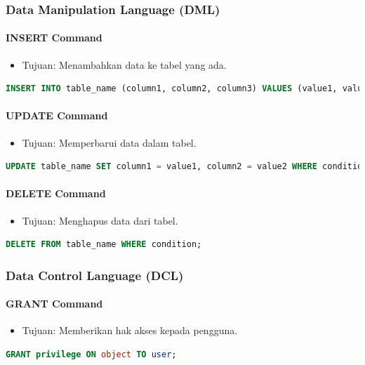 \documentclass{article}
\begin{document}
\subsubsection{Data Manipulation Language (DML)}
\paragraph{INSERT Command}
\begin{itemize}
    \item Tujuan: Menambahkan data ke tabel yang ada.
\end{itemize}
\begin{lstlisting}[language=SQL, caption={Sintaks INSERT Command}, captionpos=b]
INSERT INTO table_name (column1, column2, column3) VALUES (value1, value2, value3);
\end{lstlisting}
\paragraph{UPDATE Command}
\begin{itemize}
    \item Tujuan: Memperbarui data dalam tabel.
\end{itemize}
\begin{lstlisting}[language=SQL, caption={Sintaks UPDATE Command}, captionpos=b]
UPDATE table_name SET column1 = value1, column2 = value2 WHERE condition;
\end{lstlisting}
\paragraph{DELETE Command}
\begin{itemize}
    \item Tujuan: Menghapus data dari tabel.
\end{itemize}
\begin{lstlisting}[language=SQL, caption={Sintaks DELETE Command}, captionpos=b]
DELETE FROM table_name WHERE condition;
\end{lstlisting}

\subsubsection{Data Control Language (DCL)}
\paragraph{GRANT Command}
\begin{itemize}
    \item Tujuan: Memberikan hak akses kepada pengguna.
\end{itemize}
\begin{lstlisting}[language=SQL, caption={Sintaks GRANT Command}, captionpos=b]
GRANT privilege ON object TO user;
\end{lstlisting}
\end{document}
